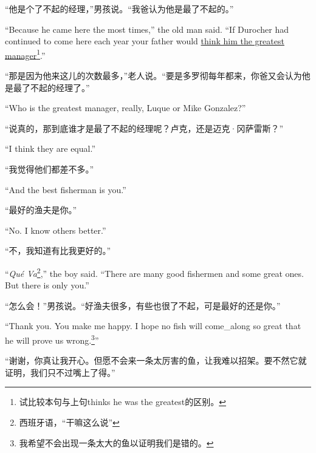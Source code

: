 \begin{paracol}{2}
\switchcolumn

“他是个了不起的经理，”男孩说。“我爸认为他是最了不起的。”

\switchcolumn*

``Because he came here the most times,'' the old man said. ``If Durocher had
continued to come here each year your father would \uline{think him the
  greatest manager}\footnote{试比较本句与上句thinks he was the greatest的区别。}.''

\switchcolumn

“那是因为他来这儿的次数最多，”老人说。“要是多罗彻每年都来，你爸又会认为他是最了不起的经理了。”

\switchcolumn*

``Who is the greatest manager, really, Luque or Mike Gonzalez?''

\switchcolumn

“说真的，那到底谁才是最了不起的经理呢？卢克，还是迈克·冈萨雷斯？”

\switchcolumn*

``I think they are \gls{equal}.''

\switchcolumn

“我觉得他们都差不多。”

\switchcolumn*

``And the best fisherman is you.''

\switchcolumn

“最好的渔夫是你。”

\switchcolumn*

``No. I know others better.''

\switchcolumn

“不，我知道有比我更好的。”

\switchcolumn*

``\emph{Qué Va}\footnote{西班牙语，“干嘛这么说”},'' the boy said. ``There are
many good fishermen and some great ones. But there is only you.''

\switchcolumn

“怎么会！”男孩说。“好渔夫很多，有些也很了不起，可是最好的还是你。”

\switchcolumn*

``Thank you. You make me happy. I hope no fish will \gls{come_along} so great that
he will prove us wrong.\footnote{我希望不会出现一条太大的鱼以证明我们是错的。}''

\switchcolumn

“谢谢，你真让我开心。但愿不会来一条太厉害的鱼，让我难以招架。要不然它就证明，我们只不过嘴上了得。”


\end{paracol}
